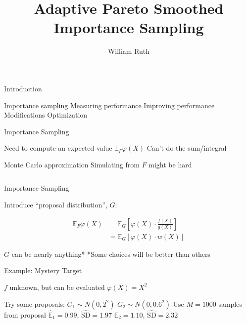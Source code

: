 \documentclass[14pt]{beamer}
\title[]{Adaptive Pareto Smoothed Importance Sampling}
\author{William Ruth}
\institute[]{Joint work with Payman Nickchi}
\date{\vspace{-3cm}}
\newcommand{\bE}{\mathbb{E}}
\begin{document}
\begin{frame}
    \titlepage
\end{frame}

\begin{frame}{Introduction}
    \begin{outline}
        \1 Importance sampling \newline
        \1 Measuring performance \newline
        \1 Improving performance
            \2 Modifications
            \2 Optimization
    \end{outline}
\end{frame}


\begin{frame}{Importance Sampling}
    \begin{outline}
        \1 Need to compute an expected value
            \2 $\bE_F \varphi(X)$
        \1 Can't do the sum/integral \newline

        \1 Monte Carlo approximation
            \2 Simulating from $F$ might be hard
    \end{outline}
    \begin{equation*}
    \end{equation*}
\end{frame}

\begin{frame}{Importance Sampling}
    \begin{outline}
        \1 Introduce ``proposal distribution'', $G$:
    \end{outline}
    \begin{align*}
        \bE_F \varphi(X) &=  \bE_G \left[ \varphi(X) \cdot \frac{f(X)}{g(X)} \right] \\
        &=  \bE_G \left[ \varphi(X) \cdot w(X) \right]
    \end{align*}
    \begin{outline}
        \1 $G$ can be nearly anything*
            \2 *Some choices will be better than others
    \end{outline}
\end{frame}

\begin{frame}{Example: Mystery Target}
    \begin{outline}
        \1 $f$ unknown, but can be evaluated 
        \1 $\varphi(X) = X^2$ \newline

        \1 Try some proposals:
            \2 $G_1 \sim N(0, 2^2)$
            \2 $G_2 \sim N(0, 0.6^2)$ \newline
        \1 Use $M=1000$ samples from proposal
            \2 $\hat{\bE}_1 = 0.99$, $\hat{\text{SD}} = 1.97$
            \2 $\hat{\bE}_2 = 1.10$, $\hat{\text{SD}} = 2.32$
    \end{outline}    
\end{frame}
\end{document}
